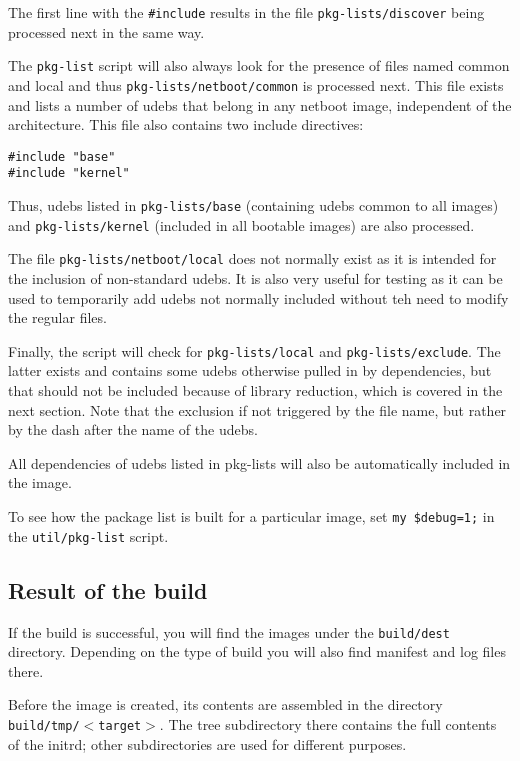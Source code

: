 \documentclass[a4paper,10pt]{article}
\begin{document}
The first line with the \texttt{\#include} results in the file \texttt{pkg-lists/discover} being processed next in the same way. 

The \texttt{pkg-list} script will also always look for the presence of files named common and local and thus \texttt{pkg-lists/netboot/common} is processed next. This file exists and lists a number of udebs that belong in any netboot image, independent of the architecture. This file also contains two include directives:

\begin{verbatim}
#include "base"
#include "kernel"
\end{verbatim}

Thus, udebs listed in \texttt{pkg-lists/base} (containing udebs common to all images) and \texttt{pkg-lists/kernel} (included in all bootable images) are also processed. 

The file \texttt{pkg-lists/netboot/local} does not normally exist as it is intended for the inclusion of non-standard udebs. It is also very useful for testing as it can be used to temporarily add udebs not normally included without teh need to modify the regular files. 

Finally, the script will check for \texttt{pkg-lists/local} and \texttt{pkg-lists/exclude}. The latter exists and contains some udebs otherwise pulled in by dependencies, but that should not be included because of library reduction, which is covered in the next section. Note that the exclusion if not triggered by the file name, but rather by the dash after the name of the udebs. 

All dependencies of udebs listed in pkg-lists will also be automatically included in the image. 

To see how the package list is built for a particular image, set \texttt{my \$debug=1;} in the \texttt{util/pkg-list} script. 


\subsection{Result of the build}
If the build is successful, you will find the images under the \texttt{build/dest} directory. Depending on the type of build you will also find manifest and log files there. 

Before the image is created, its contents are assembled in the directory \texttt{build/tmp/$<$target$>$}. The tree subdirectory there contains the full contents of the initrd; other subdirectories are used for different purposes. 
\end{document}
